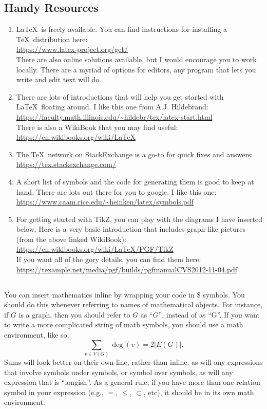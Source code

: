 \documentclass[10pt,a4paper]{article}
\begin{document}
\subsection*{Handy Resources}

\begin{enumerate}
\item \LaTeX\ is freely available. You can find instructions for installing a \TeX\ distribution here:\\
\url{https://www.latex-project.org/get/}\\
There are also online solutions available, but I would encourage you to work locally. There are a myriad of options for editors, any program that lets you write and edit text will do.
\item There are lots of introductions that will help you get started with \LaTeX\ floating around. I like this one from A.J. Hildebrand:\\
\url{https://faculty.math.illinois.edu/~hildebr/tex/latex-start.html}\\
There is also a WikiBook that you may find useful:\\
\url{https://en.wikibooks.org/wiki/LaTeX}
\item The \TeX\ network on StackExchange is a go-to for quick fixes and answers:\\
\url{https://tex.stackexchange.com/}
\item A short list of symbols and the code for generating them is good to keep at hand. There are lots out there for you to google. I like this one:\\
\url{https://www.caam.rice.edu/~heinken/latex/symbols.pdf}
\item For getting started with TikZ, you can play with the diagrams I have inserted below. Here is a very basic introduction that includes graph-like pictures (from the above linked WikiBook):\\
\url{https://en.wikibooks.org/wiki/LaTeX/PGF/TikZ}\\
If you want all of the gory details, you can find them here:\\
\url{https://texample.net/media/pgf/builds/pgfmanualCVS2012-11-04.pdf}
\end{enumerate}

\subsection*{}

You can insert mathematics inline by wrapping your code in \$ symbols. You should do this whenever referring to names of mathematical objects. For instance, if $G$ is a graph, then you should refer to $G$ as ``$G$'', instead of as ``G''. If you want to write a more complicated string of math symbols, you should use a math environment, like so,
%
\[
\sum_{v\in V(G)}\deg(v)=2|E(G)|.
\]
%
Sums will look better on their own line, rather than inline, as will any expressions that involve symbols under symbols, or symbol over symbols, as will any expression that is ``longish''. As a general rule, if you have more than one relation symbol in your expression (e.g., $=$, $\leq$, $\subset$, etc), it should be in its own math environment.
\end{document}

